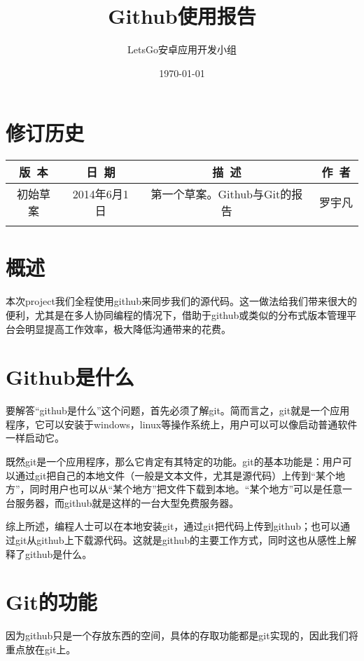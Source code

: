 \documentclass [a4paper,11pt]{article}
\title{Github使用报告}
\date{\today}
\author{LetsGo安卓应用开发小组}
\begin{document}
	
\maketitle
\section*{修订历史}

\begin{table}[!hbp]
\centering

\begin{tabular*}{\textwidth}{c|c|c|c}
\hline
\rule{0pt}{0.8cm}
版~本 & 日~期 & 描~述 & 作~者\\
\hline
\rule{0pt}{0.6cm}
初始草案 & 2014年6月1日 & 第一个草案。Github与Git的报告 & 罗宇凡\\
\hline
\rule{0pt}{0.6cm}
 &  &  & \\
\hline
\end{tabular*}

\end{table}

\section{概述}

本次project我们全程使用github来同步我们的源代码。这一做法给我们带来很大的便利，尤其是在多人协同编程的情况下，借助于github或类似的分布式版本管理平台会明显提高工作效率，极大降低沟通带来的花费。

\section{Github是什么}
       要解答“github是什么”这个问题，首先必须了解git。简而言之，git就是一个应用程序，它可以安装于windows，linux等操作系统上，用户可以可以像启动普通软件一样启动它。
       
既然git是一个应用程序，那么它肯定有其特定的功能。git的基本功能是：用户可以通过git把自己的本地文件（一般是文本文件，尤其是源代码）上传到“某个地方”，同时用户也可以从“某个地方”把文件下载到本地。“某个地方”可以是任意一台服务器，而github就是这样的一台大型免费服务器。
       
       综上所述，编程人士可以在本地安装git，通过git把代码上传到github；也可以通过git从github上下载源代码。这就是github的主要工作方式，同时这也从感性上解释了github是什么。

\section{Git的功能}
       因为github只是一个存放东西的空间，具体的存取功能都是git实现的，因此我们将重点放在git上。
  
\end{document}
